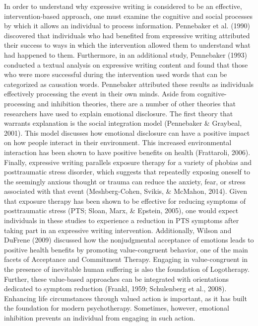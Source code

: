 \documentclass[english,man]{apa6}
\theoremstyle{definition}
\theoremstyle{definition}
\theoremstyle{definition}
\theoremstyle{remark}
\begin{document}
In order to understand why expressive writing is considered to be an
effective, intervention-based approach, one must examine the cognitive
and social processes by which it allows an individual to process
information. Pennebaker et al. (1990) discovered that individuals who
had benefited from expressive writing attributed their success to ways
in which the intervention allowed them to understand what had happened
to them. Furthermore, in an additional study, Pennebaker (1993)
conducted a textual analysis on expressive writing content and found
that those who were more successful during the intervention used words
that can be categorized as causation words. Pennebaker attributed these
results as individuals effectively processing the event in their own
minds. Aside from cognitive-processing and inhibition theories, there
are a number of other theories that researchers have used to explain
emotional disclosure. The first theory that warrants explanation is the
social integration model (Pennebaker \& Graybeal, 2001). This model
discusses how emotional disclosure can have a positive impact on how
people interact in their environment. This increased environmental
interaction has been shown to have positive benefits on health
(Frattaroli, 2006). Finally, expressive writing parallels exposure
therapy for a variety of phobias and posttraumatic stress disorder,
which suggests that repeatedly exposing oneself to the seemingly anxious
thought or trauma can reduce the anxiety, fear, or stress associated
with that event (Meshberg-Cohen, Svikis, \& McMahon, 2014). Given that
exposure therapy has been shown to be effective for reducing symptoms of
posttraumatic stress (PTS; Sloan, Marx, \& Epstein, 2005), one would
expect individuals in these studies to experience a reduction in PTS
symptoms after taking part in an expressive writing intervention.
Additionally, Wilson and DuFrene (2009) discussed how the nonjudgmental
acceptance of emotions leads to positive health benefits by promoting
value-congruent behavior, one of the main facets of Acceptance and
Commitment Therapy. Engaging in value-congruent in the presence of
inevitable human suffering is also the foundation of Logotherapy.
Further, these value-based approaches can be integrated with
orientations dedicated to symptom reduction (Frankl, 1959; Schulenberg
et al., 2008). Enhancing life circumstances through valued action is
important, as it has built the foundation for modern psychotherapy.
Sometimes, however, emotional inhibition prevents an individual from
engaging in such action.
\end{document}
